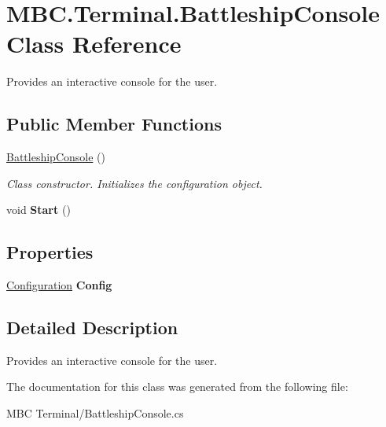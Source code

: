 \hypertarget{class_m_b_c_1_1_terminal_1_1_battleship_console}{\section{M\-B\-C.\-Terminal.\-Battleship\-Console Class Reference}
\label{class_m_b_c_1_1_terminal_1_1_battleship_console}
}


Provides an interactive console for the user. 


\subsection*{Public Member Functions}
\begin{DoxyCompactItemize}
\item 
\hypertarget{class_m_b_c_1_1_terminal_1_1_battleship_console_a1d9cdd7811c6ad93d69b64977d1670f4}{\hyperlink{class_m_b_c_1_1_terminal_1_1_battleship_console_a1d9cdd7811c6ad93d69b64977d1670f4}{Battleship\-Console} ()}\label{class_m_b_c_1_1_terminal_1_1_battleship_console_a1d9cdd7811c6ad93d69b64977d1670f4}

\begin{DoxyCompactList}\small\item\em Class constructor. Initializes the configuration object.\end{DoxyCompactList}\item 
\hypertarget{class_m_b_c_1_1_terminal_1_1_battleship_console_a24e4d77c56e575e37da9f2a7f795d2f6}{void {\bfseries Start} ()}\label{class_m_b_c_1_1_terminal_1_1_battleship_console_a24e4d77c56e575e37da9f2a7f795d2f6}

\end{DoxyCompactItemize}
\subsection*{Properties}
\begin{DoxyCompactItemize}
\item 
\hypertarget{class_m_b_c_1_1_terminal_1_1_battleship_console_a6b95099a9fb31b809a63860ba9f48867}{\hyperlink{class_m_b_c_1_1_core_1_1_configuration}{Configuration} {\bfseries Config}}\label{class_m_b_c_1_1_terminal_1_1_battleship_console_a6b95099a9fb31b809a63860ba9f48867}

\end{DoxyCompactItemize}


\subsection{Detailed Description}
Provides an interactive console for the user.

The documentation for this class was generated from the following file\-:\begin{DoxyCompactItemize}
\item 
M\-B\-C Terminal/Battleship\-Console.\-cs\end{DoxyCompactItemize}
